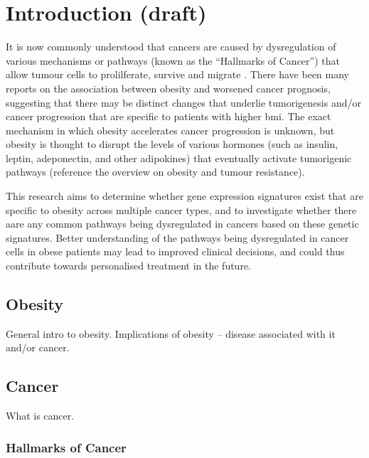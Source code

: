\chapter{Introduction (draft)}
\label{ch:intro}


It is now commonly understood that cancers are caused by dysregulation of various mechanisms or pathways (known as the ``Hallmarks of Cancer'') that allow tumour cells to prolilferate, survive and migrate \citet{Hanahan2011}.
There have been many reports on the association between obesity and worsened cancer prognosis, suggesting that there may be distinct changes that underlie tumorigenesis and/or cancer progression that are specific to patients with higher \gls{bmi}.
The exact mechanism in which obesity accelerates cancer progression is unknown, but obesity is thought to disrupt the levels of various hormones (such as insulin, leptin, adeponectin, and other adipokines) that eventually activate tumorigenic pathways (reference the overview on obesity and tumour resistance).

This research aims to determine whether gene expression signatures exist that are specific to obesity across multiple cancer types, and to investigate whether there aare any common pathways being dysregulated in cancers based on these genetic signatures.
Better understanding of the pathways being dysregulated in cancer cells in obese patients may lead to improved clinical decisions, and could thus contribute towards personalised treatment in the future.


\section{Obesity}
\label{sec:obesity}

General intro to obesity.
Implications of obesity -- disease associated with it and/or cancer.

\section{Cancer}
\label{sec:cancer}

What is cancer.

\subsection{Hallmarks of Cancer}
\label{subsec:cancerhallmarks}

